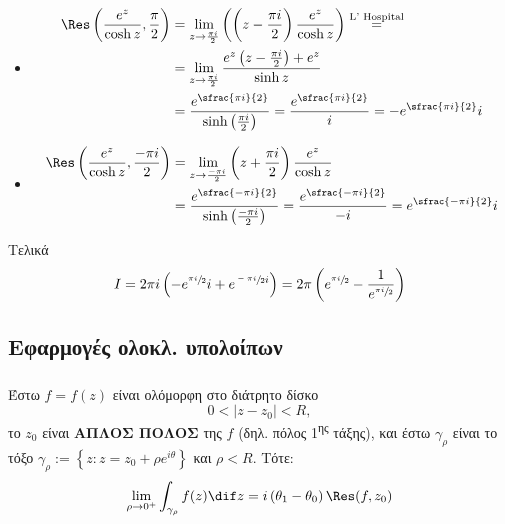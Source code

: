 \documentclass[12pt,a4paper,notitlepage,fleqn]{article}
\begin{document}
\begin{enumgreekparen}
    	\begin{itemize}
    	\item \begin{align*}
    		\Res\left(\frac{e^z}{\cosh z},\frac{\pi}{2}\right)
    		&= \lim_{z\to\frac{\pi i}{2}} \left(
    		\left(z-\frac{\pi i}{2}\right)\frac{e^z}{\cosh z}
    		\right) \overset{\text{L' Hospital}}{=}
    		\\ &=
    		\lim_{z\to \frac{\pi i}{2}}
    		\frac{e^z\left(z-\frac{\pi i}{2}\right)+e^z}{\sinh z}
    		\\ &= \frac{e^{\sfrac{\pi i}{2}}}{\sinh\left(\frac{\pi i}{2}\right)}
                    = \frac{e^{\sfrac{\pi i}{2}}}{i} = -e^{\sfrac{\pi i}{2} }i
              \end{align*}

         \item \begin{align*}
                 \Res\left(\frac{e^z}{\cosh z},\frac{-\pi i}{2}\right)
                 &= \lim_{z\to \frac{-\pi i}{2}} \left(z+\frac{\pi i }{2}\right)
                   \frac{e^z}{\cosh z}
                 \\ &= \frac{e^{\sfrac{-\pi i}{2} }}{\sinh\left(\frac{-\pi i}{2} \right)}
                     = \frac{e^{\sfrac{-\pi i}{2}}}{-i} = e^{\sfrac{-\pi i}{2} }i
    		\end{align*}
    	\end{itemize}

    	\item Τελικά
    	\[
          I = 2\pi i \left(
            -e^{\sfrac{\pi i}{2} }i + e^{\sfrac{-\pi i}{2}i
          }\right) = 2\pi\left(e^{\sfrac{\pi i}{2} }-\frac{1}{e^{\sfrac{\pi i}{2} }}\right)
    	\]
    \end{enumgreekparen}

    \subsection{Εφαρμογές ολοκλ. υπολοίπων}
    \subsubsection[Λήμμα Jordan]{}
    Έστω \( f=f(z) \) είναι ολόμορφη στο διάτρητο δίσκο
    \[
    0 < |z-z_0| < R,
    \]
    το \( z_0 \) είναι \textbf{ΑΠΛΟΣ ΠΟΛΟΣ} της \( f \)
    (δηλ. πόλος 1\textsuperscript{ης} τάξης), και έστω \( \gamma_\rho \) είναι
    το τόξο \( \gamma_\rho := \left\lbrace z:z=z_0+\rho e^{i\theta} \right\rbrace \)
    και \( \rho < R \). Τότε:
    \[
    \lim_{\rho\to 0^+} \int_{\gamma_\rho} f(z) \dif z
    = i\left(\theta_1 - \theta_0\right)\Res(f,z_0)
    \]
\end{document}
